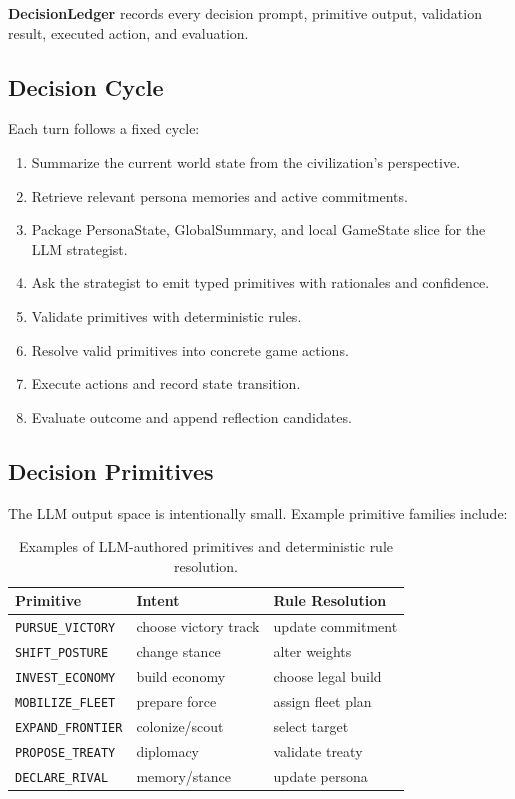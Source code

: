 \documentclass[10pt,twocolumn]{article}
\begin{document}
\textbf{DecisionLedger} records every decision prompt, primitive output, validation result, executed action, and evaluation.

\subsection{Decision Cycle}
Each turn follows a fixed cycle:

\begin{enumerate}
  \item Summarize the current world state from the civilization's perspective.
  \item Retrieve relevant persona memories and active commitments.
  \item Package PersonaState, GlobalSummary, and local GameState slice for the LLM strategist.
  \item Ask the strategist to emit typed primitives with rationales and confidence.
  \item Validate primitives with deterministic rules.
  \item Resolve valid primitives into concrete game actions.
  \item Execute actions and record state transition.
  \item Evaluate outcome and append reflection candidates.
\end{enumerate}

\subsection{Decision Primitives}
The LLM output space is intentionally small. Example primitive families include:

\begin{table}[t]
\centering
\begin{tabular}{lll}
\toprule
Primitive & Intent & Rule Resolution \\
\midrule
\texttt{PURSUE\_VICTORY} & choose victory track & update commitment \\
\texttt{SHIFT\_POSTURE} & change stance & alter weights \\
\texttt{INVEST\_ECONOMY} & build economy & choose legal build \\
\texttt{MOBILIZE\_FLEET} & prepare force & assign fleet plan \\
\texttt{EXPAND\_FRONTIER} & colonize/scout & select target \\
\texttt{PROPOSE\_TREATY} & diplomacy & validate treaty \\
\texttt{DECLARE\_RIVAL} & memory/stance & update persona \\
\bottomrule
\end{tabular}
\caption{Examples of LLM-authored primitives and deterministic rule resolution.}
\end{table}
\end{document}
